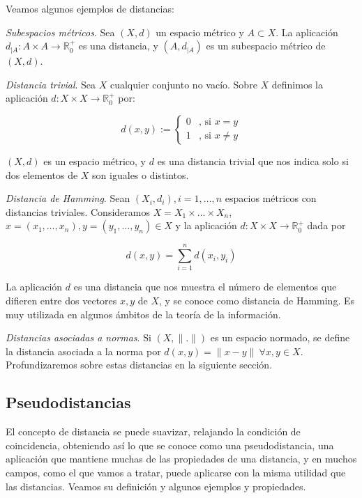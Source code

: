 \documentclass[ oneside,openany,titlepage,numbers=noenddot,headinclude,%
                footinclude=true,cleardoublepage=empty,abstractoff, %
                BCOR=5mm,paper=a4,fontsize=11pt,%
                spanish,american%
                ]{scrreprt}
\begin{document}
Veamos algunos ejemplos de distancias:

\exampleb

\emph{Subespacios métricos}. Sea $(X,d)$ un espacio métrico y $A\subset X$. La aplicación $d_{|A}:A\times A \to \mathbb{R}^+_0$ es una distancia, y $(A,d_{|A})$ es un subespacio métrico de $(X,d)$.
	
\examplee

\exampleb

\emph{Distancia trivial}. Sea $X$ cualquier conjunto no vacío. Sobre $X$ definimos la aplicación $d:X\times X \to \mathbb{R}^+_0$ por:

\[d(x,y):= \begin{cases}
0 & \text{, si } x = y \\
1 & \text{, si } x \ne y
\end{cases}\]

$(X,d)$ es un espacio métrico, y $d$ es una distancia trivial que nos indica solo si dos elementos de $X$ son iguales o distintos.

\examplee

\exampleb

\emph{Distancia de Hamming}. Sean $(X_i,d_i), i=1,\dots, n$ espacios métricos con distancias triviales. Consideramos $X = X_1 \times \dots \times X_n$, $x = (x_1,\dots,x_n), y = (y_1,\dots,y_n) \in X$ y la aplicación $d:X\times X \to \mathbb{R}^+_0$ dada por

\[d(x,y) = \sum_{i=1}^n d(x_i,y_i)\]

La aplicación $d$ es una distancia que nos muestra el número de elementos que difieren entre dos vectores $x,y$ de $X$, y se conoce como distancia de Hamming. Es muy utilizada en algunos ámbitos de la teoría de la información.

\examplee

\exampleb

\emph{Distancias asociadas a normas}. Si $(X,\|.\|)$ es un espacio normado, se define la distancia asociada a la norma por $d(x,y)=\|x-y\| \ \forall x,y\in X$. Profundizaremos sobre estas distancias en la siguiente sección.

\examplee

\subsection{Pseudodistancias}

El concepto de distancia se puede suavizar, relajando la condición de coincidencia, obteniendo así lo que se conoce como una pseudodistancia, una aplicación que mantiene muchas de las propiedades de una distancia, y en muchos campos, como el que vamos a tratar, puede aplicarse con la misma utilidad que las distancias. Veamos su definición y algunos ejemplos y propiedades.
\end{document}
